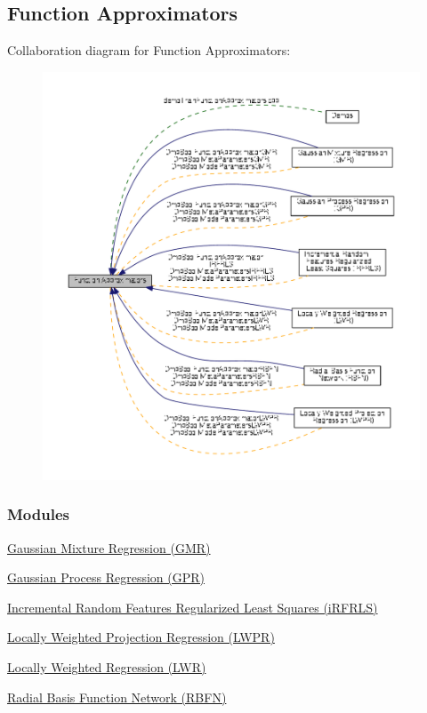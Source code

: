 \hypertarget{group__FunctionApproximators}{\subsection{Function Approximators}
\label{group__FunctionApproximators}
}
Collaboration diagram for Function Approximators\+:
\nopagebreak
\begin{figure}[H]
\begin{center}
\leavevmode
\includegraphics[width=350pt]{group__FunctionApproximators}
\end{center}
\end{figure}
\subsubsection*{Modules}
\begin{DoxyCompactItemize}
\item 
\hyperlink{group__GMR}{Gaussian Mixture Regression (\+G\+M\+R)}
\item 
\hyperlink{group__GPR}{Gaussian Process Regression (\+G\+P\+R)}
\item 
\hyperlink{group__IRFRLS}{Incremental Random Features Regularized Least Squares (i\+R\+F\+R\+L\+S)}
\item 
\hyperlink{group__LWPR}{Locally Weighted Projection Regression (\+L\+W\+P\+R)}
\item 
\hyperlink{group__LWR}{Locally Weighted Regression (\+L\+W\+R)}
\item 
\hyperlink{group__RBFN}{Radial Basis Function Network (\+R\+B\+F\+N)}
\end{DoxyCompactItemize}
